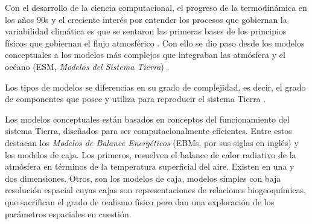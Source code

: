 Con el desarrollo de la ciencia computacional, el progreso de la termodinámica en los años 90s y el creciente interés por entender los procesos que gobiernan la variabilidad climática es que se sentaron las primeras bases de los principios físicos que gobiernan el flujo atmosférico \citep{lynch2008origins}.  Con ello se dio paso desde los modelos conceptuales a los modelos más complejos que integraban las atmósfera y el océano (ESM, \textit{Modelos del Sistema Tierra}) \citep{flato:hal-01644494}. 

Los tipos de modelos se diferencias en su grado de complejidad, es decir, el grado de componentes que posee y utiliza para reproducir el sistema Tierra \citep{weber2010utility}.

 Los modelos conceptuales están basados en conceptos del funcionamiento del sistema Tierra, diseñados para ser computacionalmente eficientes. Entre estos destacan los \textit{Modelos de Balance Energéticos} (EBMs, por sus siglas en inglés) y los modelos de caja. Los primeros, resuelven el balance de calor radiativo de la atmósfera en términos de la temperatura superficial del aire. Existen en una y dos dimensiones. Otros, son los modelos de caja, modelos simples con baja resolución espacial cuyas cajas son representaciones de relaciones biogeoquímicas, que sacrifican el grado de realismo físico pero dan una exploración de los parámetros espaciales en cuestión.

